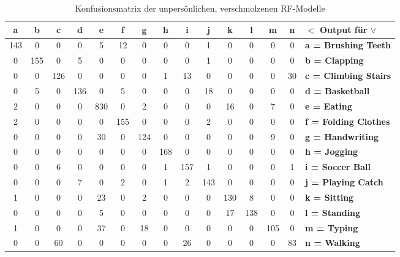 \begin{table}
	\centering
	\begin{tabular}{|c|c|c|c|c|c|c|c|c|c|c|c|c|c||l|}
		\hline 
		\textbf{a} &   \textbf{b} &   \textbf{c} &   \textbf{d} &   \textbf{e} &   \textbf{f} &   \textbf{g} &   \textbf{h} &   \textbf{i} &   \textbf{j} &   \textbf{k} &   \textbf{l} &   \textbf{m}  &  \textbf{n} & \textbf{$<$ Output für $\vee$} \\
		\hline 
		\hline
		143 &   0 &   0 &   0 &   5 &  12 &   0 &   0 &   0 &   1 &   0 &   0 &   0  &  0 &   \textbf{a = Brushing Teeth} \\
		\hline 
		0 & 155 &   0 &   5 &   0 &   0 &   0 &   0 &   0 &   1 &   0 &   0 &   0  &  0 &   \textbf{b = Clapping} \\
		\hline 
		0 &   0 & 126 &   0 &   0 &   0 &   0 &   1 &  13 &   0 &   0 &   0 &   0  & 30 &   \textbf{c = Climbing Stairs} \\
		\hline 
		0 &   5 &   0 & 136 &   0 &   5 &   0 &   0 &   0 &  18 &   0 &   0 &   0  &  0 &   \textbf{d = Basketball} \\
		\hline 
		2 &   0 &   0 &   0 & 830 &   0 &   2 &   0 &   0 &   0 &  16 &   0 &   7  &  0 &   \textbf{e = Eating} \\
		\hline 
		2 &   0 &   0 &   0 &   0 & 155 &   0 &   0 &   0 &   2 &   0 &   0 &   0  &  0 &   \textbf{f = Folding Clothes} \\
		\hline 
		0 &   0 &   0 &   0 &  30 &   0 & 124 &   0 &   0 &   0 &   0 &   0 &   9  &  0 &   \textbf{g = Handwriting} \\
		\hline 
		0 &   0 &   0 &   0 &   0 &   0 &   0 & 168 &   0 &   0 &   0 &   0 &   0  &  0 &   \textbf{h = Jogging} \\
		\hline 
		0 &   0 &   6 &   0 &   0 &   0 &   0 &   1 & 157 &   1 &   0 &   0 &   0  &  1 &   \textbf{i = Soccer Ball} \\
		\hline 
		0 &   0 &   0 &   7 &   0 &   2 &   0 &   1 &   2 & 143 &   0 &   0 &   0  &  0 &   \textbf{j = Playing Catch} \\
		\hline 
		1 &   0 &   0 &   0 &  23 &   0 &   2 &   0 &   0 &   0 & 130 &   8 &   0  &  0 &   \textbf{k = Sitting} \\
		\hline 
		0 &   0 &   0 &   0 &   5 &   0 &   0 &   0 &   0 &   0 &  17 & 138 &   0  &  0 &   \textbf{l = Standing} \\
		\hline 
		1 &   0 &   0 &   0 &  37 &   0 &  18 &   0 &   0 &   0 &   0 &   0 & 105  &  0 &   \textbf{m = Typing} \\
		\hline 
		0 &   0 &  60 &   0 &   0 &   0 &   0 &   0 &  26 &   0 &   0 &   0 &   0  & 83 &   \textbf{n = Walking} \\
		\hline 
	\end{tabular}
	\caption{Konfusionsmatrix der unpersönlichen, verschmolzenen \ac{RF}-Modelle}
	\label{tab:confusion-impersonal-rf-merged}
\end{table}

